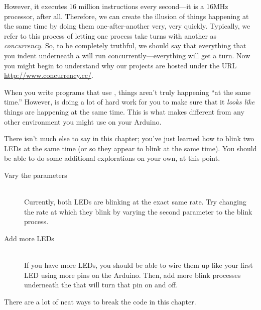 However, it executes 16 million instructions every second---it is a 16MHz processor, after all. Therefore, we can create the illusion of things happening at the same time by doing them one-after-another very, very quickly. Typically, we refer to this process of letting one process take turns with another as {\em concurrency}. So, to be completely truthful, we should say that everything that you indent underneath a \PAR will run concurrently---everything will get a turn. Now you might begin to understand why our projects are hosted under the URL \url{http://www.concurrency.cc/}.

When you write programs that use \PAR, things aren't truly happening ``at the same time.'' However, \plumbing is doing a lot of hard work for you to make sure that it {\em looks like} things are happening at the same time. This is what makes \plumbing different from any other environment you might use on your Arduino.

\EXPLORATIONS
There isn't much else to say in this chapter; you've just learned how to blink two LEDs at the same time (or so they appear to blink at the same time). You should be able to do some additional explorations on your own, at this point.

\begin{description}
	\item[Vary the parameters]\ \\
	Currently, both LEDs are blinking at the exact same rate. Try changing the rate at which they blink by varying the second parameter to the {\procname blink} process.
	\item[Add more LEDs]\ \\
	If you have more LEDs, you should be able to wire them up like your first LED using more pins on the Arduino. Then, add more {\procname blink} processes underneath the \PAR that will turn that pin on and off.
\end{description}

\BREAKAGE
There are a lot of neat ways to break the code in this chapter.

